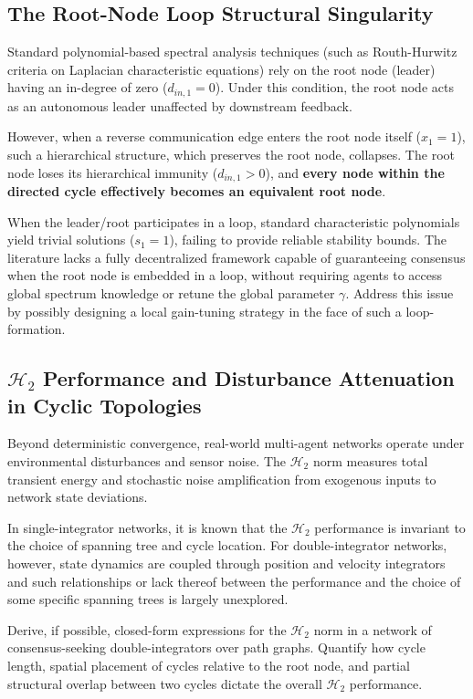 \subsection{The Root-Node Loop Structural Singularity}
Standard polynomial-based spectral analysis techniques (such as Routh-Hurwitz criteria on Laplacian characteristic equations) rely on the root node (leader) having an in-degree of zero ($d_{in,1} = 0$). Under this condition, the root node acts as an autonomous leader unaffected by downstream feedback.

However, when a reverse communication edge enters the root node itself ($x_1 = 1$), such a hierarchical structure, which preserves the root node, collapses. The root node loses its hierarchical immunity ($d_{in,1} > 0$), and \textbf{every node within the directed cycle effectively becomes an equivalent root node}.
\begin{problem}
    When the leader/root participates in a loop, standard characteristic polynomials yield trivial solutions ($s_1 = 1$), failing to provide reliable stability bounds. The literature lacks a fully decentralized framework capable of guaranteeing consensus when the root node is embedded in a loop, without requiring agents to access global spectrum knowledge or retune the global parameter $\gamma$. Address this issue by possibly designing a local gain-tuning strategy in the face of such a loop-formation.
\end{problem}
\subsection{$\mathcal{H}_2$ Performance and Disturbance Attenuation in Cyclic Topologies}
Beyond deterministic convergence, real-world multi-agent networks operate under environmental disturbances and sensor noise. The $\mathcal{H}_2$ norm measures total transient energy and stochastic noise amplification from exogenous inputs to network state deviations.

In single-integrator networks, it is known that the $\mathcal{H}_2$ performance is invariant to the choice of spanning tree and cycle location. For double-integrator networks, however, state dynamics are coupled through position and velocity integrators and such relationships or lack thereof between the performance and the choice of some specific spanning trees is largely unexplored.

\begin{problem}
    Derive, if possible, closed-form expressions for the $\mathcal{H}_2$ norm in a network of consensus-seeking double-integrators over path graphs. Quantify how cycle length, spatial placement of cycles relative to the root node, and partial structural overlap between two cycles dictate the overall $\mathcal{H}_2$ performance. 
\end{problem}
